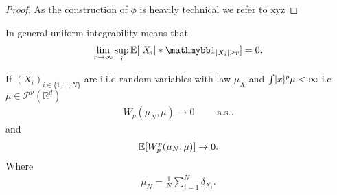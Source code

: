 \begin{proof}
  As the construction of $\phi $ is heavily technical we refer to xyz
\end{proof}
\begin{remark}
 In general uniform integrability means that 
 \begin{align*}
   \lim_{r \to  \infty} \sup_i \E[\abs{X_i}*\cha_{\abs{X_i}\ge r}] = 0
 .\end{align*}
\end{remark}
\begin{corollary}\label{wasserstein_convergence_arb}
  If $(X_i)_{i \in \{1,\ldots ,N\}  }$  are i.i.d random variables with law $\mu_X$ and $\int \lvert x\rvert^{p} \mu  < \infty $ i.e $\mu  \in  \mathcal{P}^p(\mathbb{R}^{d} ) $
 \begin{align*} 
 W_p(\mu_N,\mu ) \to  0 \qquad \text{ a.s.}
 .\end{align*}
 and 
 \begin{align*}
   \mathbb{E}[W_p^{p}(\mu_N,\mu ) ] \to 0
 .\end{align*}
 Where 
 \begin{align*}
   \mu_N = \frac{1}{N} \sum_{i=1}^{N} \delta_{X_i} 
 .\end{align*}
\end{corollary}

